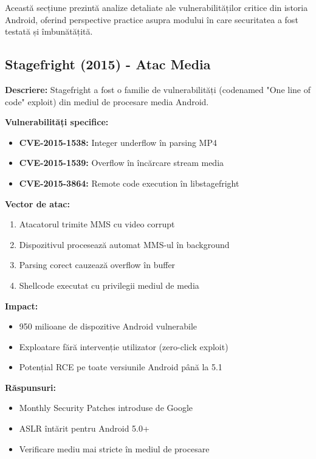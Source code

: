 \documentclass[11pt,a4paper,twocolumn]{article}
\theoremstyle{definition}
\theoremstyle{plain}
\theoremstyle{remark}
\begin{document}
Această secțiune prezintă analize detaliate ale vulnerabilităților critice din istoria Android, 
oferind perspective practice asupra modului în care securitatea a fost testată și îmbunătățită.

\subsection{Stagefright (2015) - Atac Media}

\textbf{Descriere:} Stagefright a fost o familie de vulnerabilități (codenamed "One line of code" exploit) 
din mediul de procesare media Android.

\textbf{Vulnerabilități specifice:}
\begin{itemize}
    \item \textbf{CVE-2015-1538:} Integer underflow în parsing MP4
    \item \textbf{CVE-2015-1539:} Overflow în încărcare stream media
    \item \textbf{CVE-2015-3864:} Remote code execution în libstagefright
\end{itemize}

\textbf{Vector de atac:}
\begin{enumerate}
    \item Atacatorul trimite MMS cu video corrupt
    \item Dispozitivul procesează automat MMS-ul în background
    \item Parsing corect cauzează overflow în buffer
    \item Shellcode executat cu privilegii mediul de media
\end{enumerate}

\textbf{Impact:}
\begin{itemize}
    \item 950 milioane de dispozitive Android vulnerabile
    \item Exploatare fără intervenție utilizator (zero-click exploit)
    \item Potențial RCE pe toate versiunile Android până la 5.1
\end{itemize}

\textbf{Răspunsuri:}
\begin{itemize}
    \item Monthly Security Patches introduse de Google
    \item ASLR întărit pentru Android 5.0+
    \item Verificare mediu mai stricte în mediul de procesare
\end{itemize}
\end{document}
